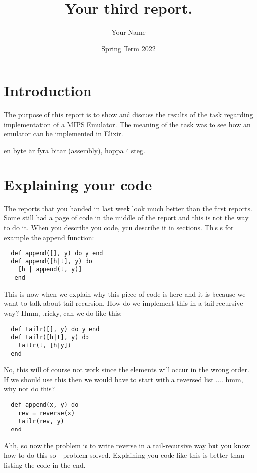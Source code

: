 \documentclass[a4paper,11pt]{article}
\begin{document}
\title{
    \textbf{Your third report.}
}
\author{Your Name}
\date{Spring Term 2022}

\maketitle

\section*{Introduction}

The purpose of this report is to show and discuss the results of the task regarding implementation
of a MIPS Emulator. The meaning of the task was to see how an emulator can be implemented in Elixir.


en byte är fyra bitar (assembly), hoppa 4 steg.

\section*{Explaining your code}

The reports that you handed in last week look much better than the
first reports. Some still had a page of code in the middle of the
report and this is not the way to do it. When you describe you code,
you describe it in sections. This s for example the append function:

\begin{verbatim}
  def append([], y) do y end
  def append([h|t], y) do 
    [h | append(t, y)]
   end
\end{verbatim}

This is now when we explain why this piece of code is here and it is
because we want to talk about tail recursion. How do we implement
this in a tail recursive way? Hmm, tricky, can we do like this:

\begin{verbatim}
  def tailr([], y) do y end
  def tailr([h|t], y) do 
    tailr(t, [h|y])
  end
\end{verbatim}

No, this will of course not work since the elements will occur in the
wrong order. If we should use this then we would have to start with a
reversed list .... hmm, why not do this?

\begin{verbatim}
  def append(x, y) do 
    rev = reverse(x)
    tailr(rev, y) 
  end
\end{verbatim}

Ahh, so now the problem is to write reverse in a tail-recursive way
but you know how to do this so - problem solved. Explaining you code
like this is better than listing the code in the end. 
\end{document}
